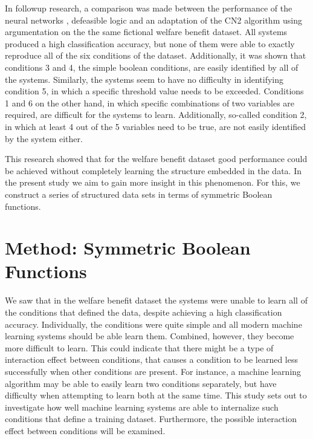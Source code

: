 \documentclass[letterpaper]{article} %
\begin{document}
In followup research, a comparison was made between the performance of the neural networks \cite{bench1993neural},  defeasible logic \cite{johnston2003induction} and an adaptation of the CN2 algorithm using argumentation \cite{movzina2005argument} on the the same fictional welfare benefit dataset. All systems produced a high classification accuracy, but none of them were able to exactly reproduce all of the six conditions of the dataset. Additionally, it was shown that conditions 3 and 4, the simple boolean conditions, are easily identified by all of the systems. Similarly, the systems seem to have no difficulty in identifying condition 5, in which a specific threshold value needs to be exceeded. Conditions 1 and 6 on the other hand, in which specific combinations of two variables are required, are difficult for the systems to learn.  Additionally, so-called condition 2, in which at least 4 out of the 5 variables need to be true, are not easily identified by the system either. 

This research showed that for the welfare benefit dataset good performance could be achieved without completely learning the structure embedded in the data. In the present study we aim to gain more insight in this phenomenon. For this, we construct a series of structured data sets in terms of symmetric Boolean functions.

\section{Method: Symmetric Boolean Functions}
We saw that in the welfare benefit dataset the systems were unable to learn all of the conditions that defined the data, despite achieving a high classification accuracy. Individually, the conditions were quite simple and all modern machine learning systems should be able learn them. Combined, however, they become more difficult to learn. This could indicate that there might be a type of interaction effect between conditions, that causes a condition to be learned less successfully when other conditions are present. For instance, a machine learning algorithm may be able to easily learn two conditions separately, but have difficulty when attempting to learn both at the same time. This study sets out to investigate how well machine learning systems are able to internalize such conditions that define a training dataset. Furthermore, the possible interaction effect between conditions will be examined.
\end{document}
